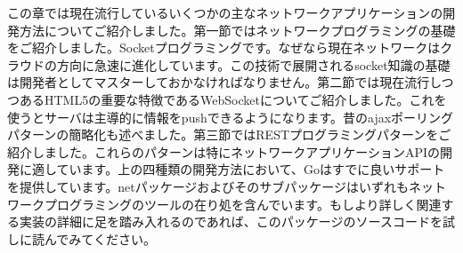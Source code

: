 この章では現在流行しているいくつかの主なネットワークアプリケーションの開発方法についてご紹介しました。第一節ではネットワークプログラミングの基礎をご紹介しました。Socketプログラミングです。なぜなら現在ネットワークはクラウドの方向に急速に進化しています。この技術で展開されるsocket知識の基礎は開発者としてマスターしておかなければなりません。第二節では現在流行しつつあるHTML5の重要な特徴であるWebSocketについてご紹介しました。これを使うとサーバは主導的に情報をpushできるようになります。昔のajaxポーリングパターンの簡略化も述べました。第三節ではRESTプログラミングパターンをご紹介しました。これらのパターンは特にネットワークアプリケーションAPIの開発に適しています。上の四種類の開発方法において、Goはすでに良いサポートを提供しています。netパッケージおよびそのサブパッケージはいずれもネットワークプログラミングのツールの在り処を含んでいます。もしより詳しく関連する実装の詳細に足を踏み入れるのであれば、このパッケージのソースコードを試しに読んでみてください。
